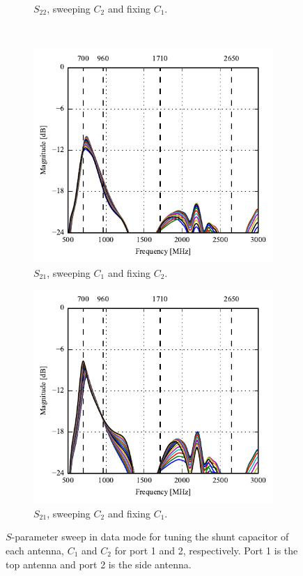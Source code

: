 \begin{figure}[htbp]
\begin{subfigure}[b]{0.49\linewidth}
        \caption{$S_{22}$, sweeping $C_2$ and fixing $C_1$.}
    \end{subfigure}
~
    \begin{subfigure}[b]{0.49\linewidth}
        \centering
        \includegraphics{img/tech_sol/monopole/data_mode/s21_s11}
        \caption{$S_{21}$, sweeping $C_1$ and fixing $C_2$.}
    \end{subfigure}
    \hfill
    \begin{subfigure}[b]{0.49\linewidth}
        \centering
        \includegraphics{img/tech_sol/monopole/data_mode/s21_s22}
        \caption{$S_{21}$, sweeping $C_2$ and fixing $C_1$.}
    \end{subfigure}
    \caption{$S$-parameter sweep in data mode for tuning the shunt capacitor of each antenna, $C_1$ and $C_2$ for port 1 and 2, respectively. Port 1 is the top antenna and port 2 is the side antenna.}
    \label{fig:sparam_mono_data_mode}
\end{figure}

